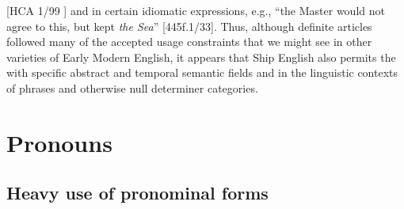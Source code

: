 [HCA 1/99  \citealt{Islands1722}] and in certain idiomatic expressions, e.g., “the Master would not agree to this, but kept \textit{the Sea}” [445f.1/33]. Thus, although definite articles followed many of the accepted usage constraints that we might see in other varieties of Early Modern English, it appears that Ship English also permits the  with specific abstract and temporal semantic fields and in the linguistic contexts of  phrases and otherwise null determiner categories. 

\section{{Pronouns}}%

\subsection{{Heavy use of pronominal forms}}%

